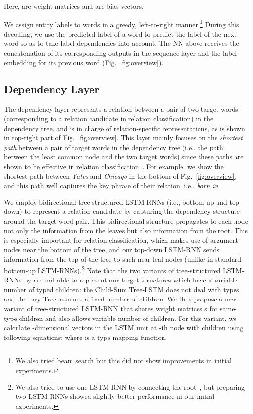 \documentclass[11pt]{article}
\begin{document}
Here,  are weight matrices and  are bias vectors. 

We assign entity labels to words in a greedy, left-to-right manner.\footnote{We also tried beam search but this did not show improvements in initial experiments.}
During this decoding, we use the predicted label of a word to predict the label of the next word so as to take label dependencies into account. The NN above receives the concatenation of its corresponding outputs in the sequence layer and the label embedding for its previous word (Fig.~\ref{fig:overview}). 

\subsection{Dependency Layer}

The dependency layer represents a relation between a pair of two target words (corresponding to a relation candidate in relation classification) in the dependency tree, and is in charge of relation-specific representations, as is shown in top-right part of Fig.~\ref{fig:overview}. This layer mainly focuses on the \emph{shortest path} between a pair of target words in the dependency tree (i.e., the path between the least common node and the two target words) since these paths are shown to be effective in relation classification~\cite{xu-EtAl:2015:EMNLP1}. For example, we show the shortest path between {\it Yates} and {\it Chicago} in the bottom of Fig.~\ref{fig:overview}, and this path well captures the key phrase of their relation, i.e., {\it born in}.

We employ bidirectional tree-structured LSTM-RNNs (i.e., bottom-up and top-down) to represent a relation candidate by capturing the dependency structure around the target
word pair. This bidirectional structure propagates to each node not only the information from the leaves but also information from the root. This is especially important for relation classification, which makes use of argument nodes near the bottom of the tree, and our top-down LSTM-RNN sends information from the top of the tree to such near-leaf nodes (unlike in standard bottom-up LSTM-RNNs).\footnote{We also tried to use one LSTM-RNN by connecting the root~\cite{NIPS2014_5275}, but preparing two LSTM-RNNs showed slightly better performance in our initial experiments.}
Note that the two variants of tree-structured LSTM-RNNs by  are not able to represent our target structures which have a variable number of typed children: the Child-Sum Tree-LSTM does not deal with types and the -ary Tree assumes a fixed number of children. 
We thus propose a new variant of tree-structured LSTM-RNN that shares weight matrices s for same-type children and also allows variable number of children. For
this variant, we calculate -dimensional vectors in the LSTM unit at -th node with  children using following equations:
\vspace{-0.15cm}
where  is a type mapping function. 
\end{document}

